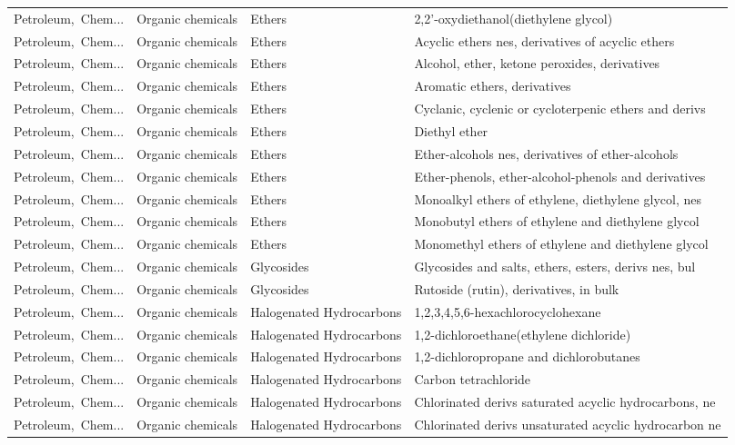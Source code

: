 \begin{appendices}
\begin{xltabular}{\textwidth}{|p{0.10\textwidth}|p{0.25\textwidth}|p{0.24\textwidth}|p{0.31\textwidth}|}
Petroleum,\ Chem... & Organic chemicals & Ethers & 2,2'-oxydiethanol(diethylene glycol) \\
Petroleum,\ Chem... & Organic chemicals & Ethers & Acyclic ethers nes, derivatives of acyclic ethers \\
Petroleum,\ Chem... & Organic chemicals & Ethers & Alcohol, ether, ketone peroxides, derivatives \\
Petroleum,\ Chem... & Organic chemicals & Ethers & Aromatic ethers, derivatives \\
Petroleum,\ Chem... & Organic chemicals & Ethers & Cyclanic, cyclenic or cycloterpenic ethers and derivs \\
Petroleum,\ Chem... & Organic chemicals & Ethers & Diethyl ether \\
Petroleum,\ Chem... & Organic chemicals & Ethers & Ether-alcohols nes, derivatives of ether-alcohols \\
Petroleum,\ Chem... & Organic chemicals & Ethers & Ether-phenols, ether-alcohol-phenols and derivatives \\
Petroleum,\ Chem... & Organic chemicals & Ethers & Monoalkyl ethers of ethylene, diethylene glycol, nes \\
Petroleum,\ Chem... & Organic chemicals & Ethers & Monobutyl ethers of ethylene and diethylene glycol \\
Petroleum,\ Chem... & Organic chemicals & Ethers & Monomethyl ethers of ethylene and diethylene glycol \\
Petroleum,\ Chem... & Organic chemicals & Glycosides & Glycosides and salts, ethers, esters, derivs nes, bul \\
Petroleum,\ Chem... & Organic chemicals & Glycosides & Rutoside (rutin), derivatives, in bulk \\
Petroleum,\ Chem... & Organic chemicals & Halogenated Hydrocarbons & 1,2,3,4,5,6-hexachlorocyclohexane \\
Petroleum,\ Chem... & Organic chemicals & Halogenated Hydrocarbons & 1,2-dichloroethane(ethylene dichloride) \\
Petroleum,\ Chem... & Organic chemicals & Halogenated Hydrocarbons & 1,2-dichloropropane and dichlorobutanes \\
Petroleum,\ Chem... & Organic chemicals & Halogenated Hydrocarbons & Carbon tetrachloride \\
Petroleum,\ Chem... & Organic chemicals & Halogenated Hydrocarbons & Chlorinated derivs saturated acyclic hydrocarbons, ne \\
Petroleum,\ Chem... & Organic chemicals & Halogenated Hydrocarbons & Chlorinated derivs unsaturated acyclic hydrocarbon ne \\

\end{xltabular}
\end{appendices}
